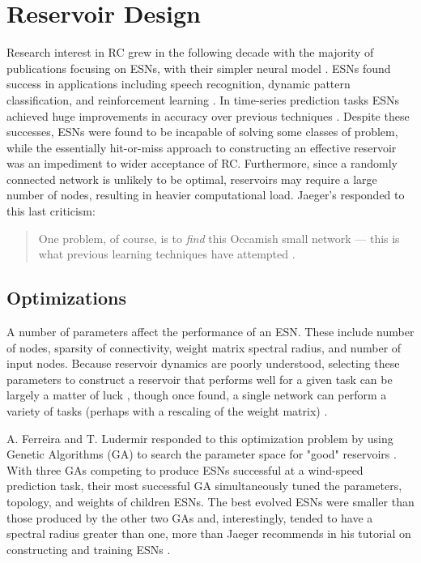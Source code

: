 \documentclass{article}
\begin{document}
    \section{Reservoir Design}\label{design}
     Research interest in  RC grew in the following decade with the majority of 
     publications focusing on ESNs, with their simpler neural model 
     \cite{bye2016investigation}. ESNs found success in applications including 
     speech recognition, dynamic pattern classification, and reinforcement 
     learning \cite{rodan2011minimum}. In time-series prediction tasks ESNs 
     achieved huge improvements in accuracy over previous techniques 
     \cite{jaeger2004harnessing}. Despite these successes, ESNs were found to 
     be incapable of solving some classes of problem, while  the essentially 
     hit-or-miss approach to constructing an effective reservoir was an 
     impediment to wider acceptance of RC.  Furthermore, since a randomly 
     connected network is unlikely to be optimal, reservoirs may require a 
     large number of nodes, resulting in heavier computational load.  Jaeger's 
     responded to this last criticism: \begin{quote}
     One problem, of course, is to \textit{find} this Occamish small network 
     --- this is what previous learning techniques have attempted 
     \cite{jaeger2001echo}.

     \end{quote} 


     
     \subsection{Optimizations}
     A number of parameters affect the performance of an ESN.  These include 
     number of nodes, sparsity of connectivity, weight matrix spectral radius, 
     and number of input nodes.  Because reservoir dynamics are poorly 
     understood, selecting these parameters to construct a reservoir that 
     performs well for a given task can be largely a matter of luck 
     \cite{xue2007decoupled}, though once found, a single network can perform a 
     variety of tasks (perhaps with a rescaling of the weight matrix) 
    \cite{jaeger2001echo}.\par
      A. Ferreira and T. Ludermir responded to this optimization problem by 
      using Genetic Algorithms (GA) to search the parameter space for "good" 
      reservoirs \cite{ferreira2011comparing}. With three GAs competing to 
      produce ESNs successful at a wind-speed prediction task, their most 
      successful GA simultaneously tuned the parameters, topology, and weights 
      of children ESNs. The best evolved ESNs were smaller than those produced 
      by the other two GAs and, interestingly, tended to have a  spectral 
      radius greater than one, more than Jaeger recommends in his tutorial on 
      constructing and training ESNs \cite{jaeger2002tutorial}. \par
\end{document}
